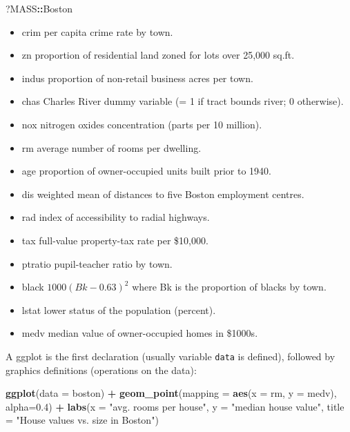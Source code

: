 \documentclass[]{book}
\newenvironment{Shaded}{\begin{snugshade}}{\end{snugshade}}
\newcommand{\KeywordTok}[1]{\textcolor[rgb]{0.13,0.29,0.53}{\textbf{#1}}}
\newcommand{\DataTypeTok}[1]{\textcolor[rgb]{0.13,0.29,0.53}{#1}}
\newcommand{\FloatTok}[1]{\textcolor[rgb]{0.00,0.00,0.81}{#1}}
\newcommand{\StringTok}[1]{\textcolor[rgb]{0.31,0.60,0.02}{#1}}
\newcommand{\OperatorTok}[1]{\textcolor[rgb]{0.81,0.36,0.00}{\textbf{#1}}}
\newcommand{\NormalTok}[1]{#1}
\providecommand{\tightlist}{%
  \setlength{\itemsep}{0pt}\setlength{\parskip}{0pt}}
\begin{document}
\begin{Shaded}
\begin{Highlighting}[]
\NormalTok{?MASS}\OperatorTok{::}\NormalTok{Boston}
\end{Highlighting}
\end{Shaded}

\begin{itemize}
\tightlist
\item
  crim per capita crime rate by town.
\item
  zn proportion of residential land zoned for lots over 25,000 sq.ft.
\item
  indus proportion of non-retail business acres per town.
\item
  chas Charles River dummy variable (= 1 if tract bounds river; 0
  otherwise).
\item
  nox nitrogen oxides concentration (parts per 10 million).
\item
  rm average number of rooms per dwelling.
\item
  age proportion of owner-occupied units built prior to 1940.
\item
  dis weighted mean of distances to five Boston employment centres.
\item
  rad index of accessibility to radial highways.
\item
  tax full-value property-tax rate per \$10,000.
\item
  ptratio pupil-teacher ratio by town.
\item
  black \(1000(Bk - 0.63)^2\) where Bk is the proportion of blacks by
  town.
\item
  lstat lower status of the population (percent).
\item
  medv median value of owner-occupied homes in \$1000s.
\end{itemize}

A ggplot is the first declaration (usually variable \texttt{data} is
defined), followed by graphics definitions (operations on the data):

\begin{Shaded}
\begin{Highlighting}[]
\KeywordTok{ggplot}\NormalTok{(}\DataTypeTok{data =}\NormalTok{ boston) }\OperatorTok{+}\StringTok{ }
\StringTok{  }\KeywordTok{geom_point}\NormalTok{(}\DataTypeTok{mapping =} \KeywordTok{aes}\NormalTok{(}\DataTypeTok{x =}\NormalTok{ rm, }\DataTypeTok{y =}\NormalTok{ medv), }\DataTypeTok{alpha=}\FloatTok{0.4}\NormalTok{) }\OperatorTok{+}
\StringTok{  }\KeywordTok{labs}\NormalTok{(}\DataTypeTok{x =} \StringTok{"avg. rooms per house"}\NormalTok{,}
       \DataTypeTok{y =} \StringTok{"median house value"}\NormalTok{,}
       \DataTypeTok{title =} \StringTok{"House values vs. size in Boston"}\NormalTok{)}
\end{Highlighting}
\end{Shaded}
\end{document}
